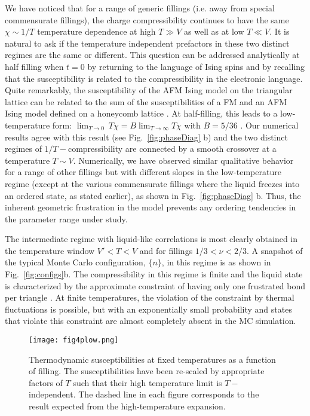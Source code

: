 \documentclass[aps,prx,onecolumn,amsmath,nofootinbib,amssymb,11pt]{revtex4-1}
\begin{document}
{We have noticed that for a range of generic fillings (i.e. away from special commensurate fillings), the charge compressibility continues to have the same $\chi\sim1/T$ temperature dependence at high $T\gg V$ as well as at low $T\ll V$. It is natural to ask if the temperature independent prefactors in these two distinct regimes are the same or different. This question can be addressed analytically at half filling when $t=0$ by returning to the language of Ising spins and by recalling that the susceptibility is related to the compressibility in the electronic language. Quite remarkably, the susceptibility of the AFM Ising model on the triangular lattice can be related to the sum of the susceptibilities of a FM and an AFM Ising model defined on a honeycomb lattice \cite{Fisher59}. At half-filling, this leads to a low-temperature form: $\lim_{T\rightarrow 0}~T\chi=B\lim_{T\rightarrow \infty}T\chi$ with $B=5/36$ \cite{antiferrosuceptHF}. Our numerical results agree with this result (see Fig.~\ref{fig:phaseDiag} b) and the two distinct regimes of $1/T-$compressibility are connected by a smooth crossover at a temperature $T\sim V$.  Numerically, we have observed similar qualitative behavior for a range of other fillings but with different slopes in the low-temperature regime (except at the various commensurate fillings where the liquid freezes into an ordered state, as stated earlier), as shown in Fig.~\ref{fig:phaseDiag} b. Thus, the inherent geometric frustration in the model prevents any ordering tendencies in the parameter range under study. 

The intermediate regime with liquid-like correlations is most clearly obtained in the temperature window $V'<T<V$ and for fillings $1/3<\nu<2/3$. A snapshot of the typical Monte Carlo configuration, $\{n\}$, in this regime is as shown in Fig.~\ref{fig:configs}b. The compressibility in this regime is finite and the liquid state is characterized by the approximate constraint of having only one frustrated bond per triangle \cite{NovikovLevitov,chamon2017topological}. At finite temperatures, the violation of the constraint by thermal fluctuations is possible, but with an exponentially small probability and states that violate this constraint are almost completely absent in the MC simulation. 


\captionsetup[figure]{justification=centerlast}
\begin{figure}[ht!]
    \centering
    \texttt{[image: fig4plow.png]}
    \caption{\textsf{Thermodynamic susceptibilities at fixed temperatures as a function of filling. The susceptibilities have been re-scaled by appropriate factors of $T$ such that their high temperature limit is $T-$independent. The dashed line in each figure corresponds to the result expected from the high-temperature expansion.}}
    \label{fig:ThermoQ}%
\end{figure}

}
\end{document}
